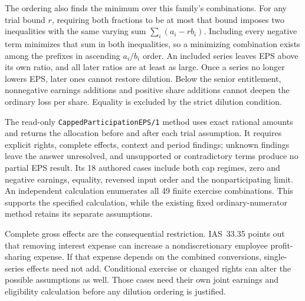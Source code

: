 The ordering also finds the minimum over this family's combinations. For any
trial bound \(r\), requiring both fractions to be at most that bound imposes
two inequalities with the same varying sum
\(\sum_i(a_i-rb_i)\). Including every negative term minimizes that sum in
both inequalities, so a minimizing combination exists among the prefixes in
ascending \(a_i/b_i\) order. An included series leaves EPS above its own
ratio, and all later ratios are at least as large. Once a series no longer
lowers EPS, later ones cannot restore dilution. Below the senior entitlement,
nonnegative earnings additions and positive share additions cannot deepen the
ordinary loss per share. Equality is excluded by the strict dilution condition.

The read-only \texttt{CappedParticipationEPS/1} method uses exact rational
amounts and returns the allocation before and after each trial assumption.
It requires explicit rights, complete effects, context and period findings;
unknown findings leave the answer unresolved, and unsupported or contradictory
terms produce no partial EPS result. Its 18 authored cases include both cap
regimes, zero and negative earnings, equality, reversed input order and the
nonparticipating limit. An independent calculation enumerates all 49 finite
exercise combinations. This supports the specified calculation, while the
existing fixed ordinary-numerator method retains its separate assumptions.

Complete gross effects are the consequential restriction. IAS~33.35 points
out that removing interest expense can increase a nondiscretionary employee
profit-sharing expense. If that expense depends on the combined conversions,
single-series effects need not add. Conditional exercise or changed rights
can alter the possible assumptions as well. Those cases need their own joint
earnings and eligibility calculation before any dilution ordering is justified.
